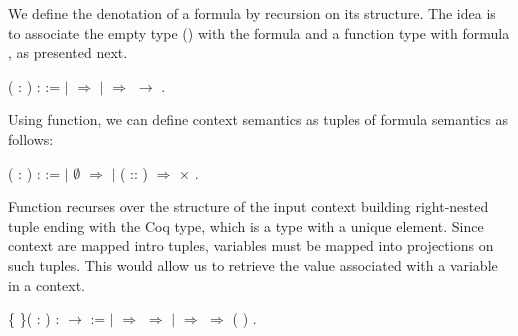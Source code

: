 We define the denotation of a formula by recursion on its structure. The idea is to associate the
empty type () with the formula  and a function type with formula   ,
as presented next.
 \begin{coqdoccode}
\coqdocemptyline
\coqdocnoindent
{}  ( : \coqdocvar{$\alpha$}) :  :=\coqdoceol
\coqdocindent{1.00em}
  \coqdoceol
\coqdocindent{1.00em}
\ensuremath{|}  \ensuremath{\Rightarrow}  \ensuremath{|}    \ensuremath{\Rightarrow}   \ensuremath{\rightarrow}  \coqdoceol
\coqdocindent{1.00em}
.\coqdoceol
\coqdocemptyline
\end{coqdoccode}
Using  function, we can define context semantics as tuples
of formula semantics as follows:
 \begin{coqdoccode}
\coqdocemptyline
\coqdocnoindent
{}  ( : \coqdocvar{$\Gamma$}) :  :=\coqdoceol
\coqdocindent{1.00em}
  \coqdoceol
\coqdocindent{1.00em}
\ensuremath{|} $\emptyset$ \ensuremath{\Rightarrow}  \ensuremath{|} ( :: ) \ensuremath{\Rightarrow}   \ensuremath{\times}  \coqdoceol
\coqdocindent{1.00em}
.\coqdoceol
\end{coqdoccode}
Function  recurses over the structure of the input context building
right-nested tuple ending with the Coq  type, which is a type with a
unique element. Since context are mapped intro tuples, variables must be
mapped into projections on such tuples. This would allow us to retrieve the
value associated with a variable in a context.
\begin{coqdoccode}
\coqdocemptyline
\coqdocnoindent
{}  \{ \}( :   ) :   \ensuremath{\rightarrow}   :=\coqdoceol
\coqdocindent{2.00em}
  \coqdoceol
\coqdocindent{2.00em}
\ensuremath{|}  \ensuremath{\Rightarrow}   \ensuremath{\Rightarrow}   \ensuremath{|}   \ensuremath{\Rightarrow}   \ensuremath{\Rightarrow}   ( )\coqdoceol
\coqdocindent{2.00em}
.\coqdoceol
\coqdocemptyline
\end{coqdoccode}
